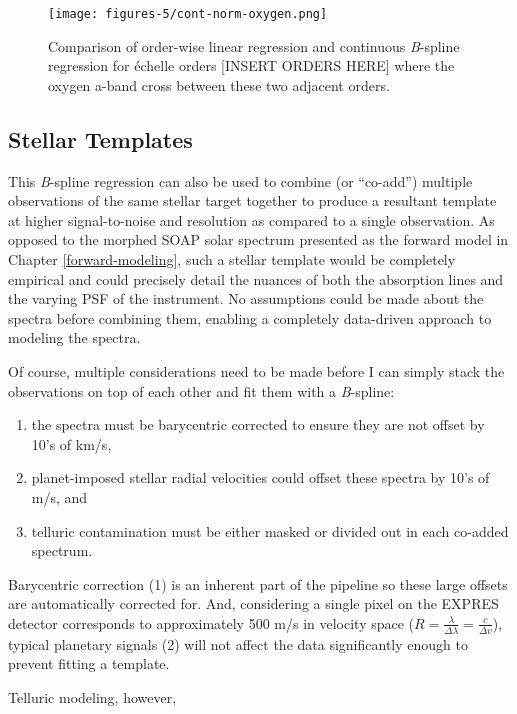 \begin{figure}[H]
    \centering
    \texttt{[image: figures-5/cont-norm-oxygen.png]}
    \caption{Comparison of order-wise linear regression and continuous \textit{B}-spline regression for \'{e}chelle orders [INSERT ORDERS HERE] where the oxygen a-band cross between these two adjacent orders.}
    \label{fig:cont-norm-oxygen}
\end{figure}

\subsection{Stellar Templates} \label{pipeline2:bspline:templates}

This \textit{B}-spline regression can also be used to combine (or ``co-add'') multiple observations of the same stellar target together to produce a resultant template at higher signal-to-noise and resolution as compared to a single observation. As opposed to the morphed SOAP solar spectrum presented as the forward model in Chapter \ref{forward-modeling}, such a stellar template would be completely empirical and could precisely detail the nuances of both the absorption lines and the varying PSF of the instrument. No assumptions could be made about the spectra before combining them, enabling a completely data-driven approach to modeling the spectra.

Of course, multiple considerations need to be made before I can simply stack the observations on top of each other and fit them with a \textit{B}-spline:
\begin{enumerate}
    \item the spectra must be barycentric corrected to ensure they are not offset by 10's of km/s,
    \item planet-imposed stellar radial velocities could offset these spectra by 10's of m/s, and
    \item telluric contamination must be either masked or divided out in each co-added spectrum.
\end{enumerate}
Barycentric correction (1) is an inherent part of the pipeline so these large offsets are automatically corrected for. And, considering a single pixel on the EXPRES detector corresponds to approximately 500 m/s in velocity space ($R = \frac{\lambda}{\Delta\lambda} = \frac{c}{\Delta v}$), typical planetary signals (2) will not affect the data significantly enough to prevent fitting a template.

Telluric modeling, however, 

